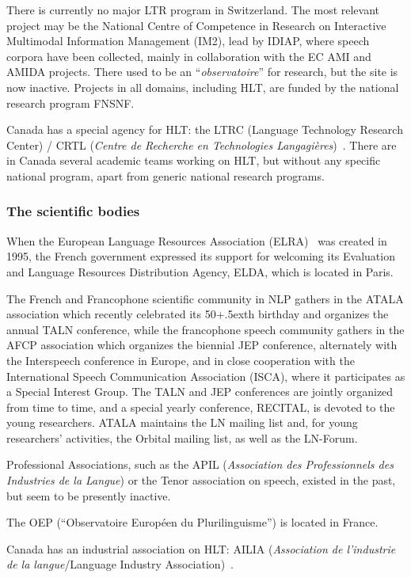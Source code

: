 \begin{multicols}{2}
There is currently no major LTR program in Switzerland. The most
relevant project may be the National Centre of Competence in Research
on Interactive Multimodal Information Management (IM2), lead by IDIAP,
where speech corpora have been collected, mainly in collaboration with
the EC AMI and AMIDA projects. There used to be an ``{\em observatoire}'' for
research, but the site is now inactive. Projects in all domains,
including HLT, are funded by the national research program FNSNF.

Canada has a special agency for HLT: the LTRC (Language Technology
Research Center) / CRTL ({\em Centre de Recherche en Technologies
Langagières})~\cite{canadacrtl}. There are in Canada several academic teams working on
HLT, but without any specific national program, apart from generic
national research programs.

\subsubsection{The scientific bodies}

When the European Language Resources Association (ELRA)~\cite{elra} was created
in 1995, the French government expressed its support for welcoming its
Evaluation and Language Resources Distribution Agency, ELDA, which is
located in Paris.

The French and Francophone scientific community in NLP gathers in the
ATALA association which recently celebrated its 50\raise+.5ex\hbox{th} birthday and
organizes the annual TALN conference, while the francophone speech
community gathers in the AFCP association which organizes the biennial
JEP conference, alternately with the Interspeech conference in Europe,
and in close cooperation with the International Speech Communication
Association (ISCA), where it participates as a Special Interest
Group. The TALN and JEP conferences are jointly organized from time to
time, and a special yearly conference, RECITAL, is devoted to the
young researchers. ATALA maintains the LN mailing list and, for young
researchers’ activities, the Orbital mailing list, as well as the
LN-Forum.

Professional Associations, such as the APIL ({\em Association des
Professionnels des Industries de la Langue}) or the Tenor association
on speech, existed in the past, but seem to be presently inactive.

The OEP (``Observatoire Européen du Plurilinguisme'') is located in France\cite{OEP}.

Canada has an industrial association on HLT: AILIA ({\em Association de
l'industrie de la langue}/Language Industry Association)~\cite{ailia}.


\end{multicols}
